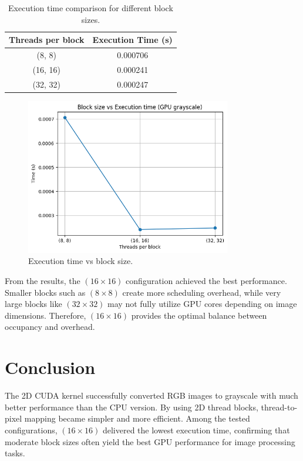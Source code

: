 \documentclass[a4paper,12pt]{article}
\begin{document}
\begin{table}[H]
\centering
\begin{tabular}{|c|c|}
\hline
\textbf{Threads per block} & \textbf{Execution Time (s)} \\ \hline
(8, 8) & 0.000706 \\ \hline
(16, 16) &  0.000241 \\ \hline
(32, 32) & 0.000247 \\ \hline
\end{tabular}
\caption{Execution time comparison for different block sizes.}
\end{table}



\begin{figure}
    \centering
    \includegraphics[width=0.8\textwidth]{compareGraph.png}
    \caption{Execution time vs block size.}
    \label{fig:placeholder}
\end{figure}

From the results, the $(16\times16)$ configuration achieved the best performance.
Smaller blocks such as $(8\times8)$ create more scheduling overhead,
while very large blocks like $(32\times32)$ may not fully utilize GPU cores depending on image dimensions.
Therefore, $(16\times16)$ provides the optimal balance between occupancy and overhead.

\section*{Conclusion}
The 2D CUDA kernel successfully converted RGB images to grayscale with much better performance than the CPU version.
By using 2D thread blocks, thread-to-pixel mapping became simpler and more efficient.
Among the tested configurations, $(16\times16)$ delivered the lowest execution time,
confirming that moderate block sizes often yield the best GPU performance for image processing tasks.
\end{document}
